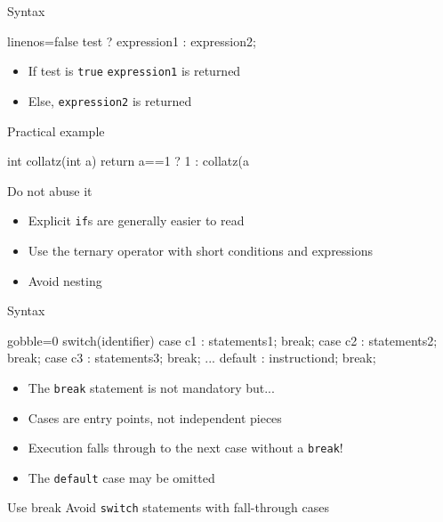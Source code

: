 \begin{frame}[fragile]
  \begin{block}{Syntax}
    \begin{cppcode*}{linenos=false}
      test ? expression1 : expression2;
    \end{cppcode*}
    \vspace{-0.2cm}
    \begin{itemize}
      \item If test is \texttt{true} \texttt{expression1} is returned
      \item Else, \texttt{expression2} is returned
    \end{itemize}
  \end{block}
  \pause
  \begin{exampleblock}{Practical example}
    \begin{cppcode*}{}
      int collatz(int a) {
        return a==1 ? 1 : collatz(a%
      }
    \end{cppcode*}
  \end{exampleblock}
  \pause
  \begin{alertblock}{Do not abuse it}
    \begin{itemize}
      \item Explicit \texttt{if}s are generally easier to read
      \item Use the ternary operator with short conditions and expressions
      \item Avoid nesting
    \end{itemize}
  \end{alertblock}
\end{frame}

\begin{frame}[fragile]
  \begin{block}{Syntax}
    \begin{cppcode*}{gobble=0}
      switch(identifier) {
        case c1 : statements1; break;
        case c2 : statements2; break;
        case c3 : statements3; break;
        ...
        default : instructiond; break;
      }
    \end{cppcode*}
    \begin{itemize}
      \item The \texttt{break} statement is not mandatory but...
      \item Cases are entry points, not independent pieces
      \item Execution falls through to the next case without a \texttt{break}!
      \item The \texttt{default} case may be omitted
    \end{itemize}
  \end{block}
  \pause
  \begin{alertblock}{Use break}
    Avoid \texttt{switch} statements with fall-through cases
  \end{alertblock}
\end{frame}

